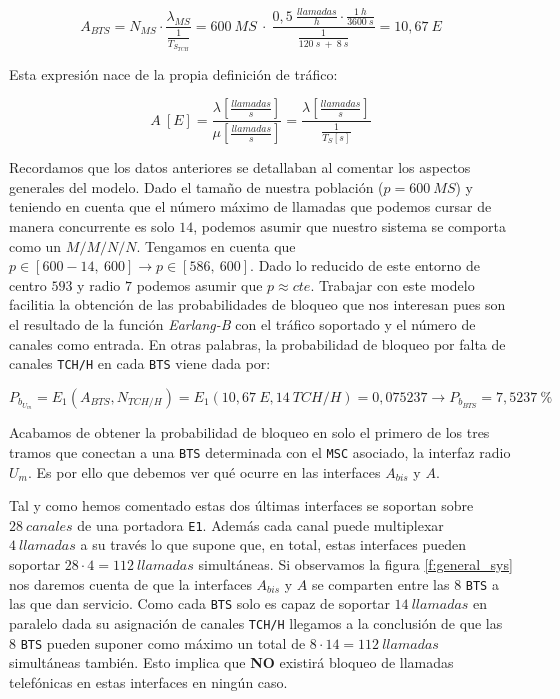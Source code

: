 \documentclass[10pt]{article}
\begin{document}
			$$A_{BTS} = N_{MS} \cdot \frac{\lambda_{MS}}{\frac{1}{T_{S_{TCH}}}} = 600\ MS\ \cdot\ \frac{0,5\ \frac{llamadas}{h} \cdot \frac{1\ h}{3600\ s}}{\frac{1}{120\ s\ +\ 8\ s}} = 10,67\ E$$

			Esta expresión nace de la propia definición de tráfico:
			
			$$A\ [E] = \frac{\lambda [\frac{llamadas}{s}]}{\mu [\frac{llamadas}{s}]} = \frac{\lambda [\frac{llamadas}{s}]}{\frac{1}{T_S [s]}}$$

			Recordamos que los datos anteriores se detallaban al comentar los aspectos generales del modelo. Dado el tamaño de nuestra población ($p = 600\ MS$) y teniendo en cuenta que el número máximo de llamadas que podemos cursar de manera concurrente es solo $14$, podemos asumir que nuestro sistema se comporta como un $M/M/N/N$. Tengamos en cuenta que $p \in [600 - 14,\ 600] \rightarrow p \in [586,\ 600]$. Dado lo reducido de este entorno de centro $593$ y radio $7$ podemos asumir que $p \approx cte$. Trabajar con este modelo facilitia la obtención de las probabilidades de bloqueo que nos interesan pues son el resultado de la función \textit{Earlang-B} con el tráfico soportado y el número de canales como entrada. En otras palabras, la probabilidad de bloqueo por falta de canales \texttt{TCH/H} en cada \texttt{BTS} viene dada por:

			$$P_{b_{U_m}} = E_1(A_{BTS}, N_{TCH/H}) = E_1(10,67\ E, 14\ TCH/H) = 0,075237 \rightarrow P_{b_{BTS}} = 7,5237\ \%$$

			Acabamos de obtener la probabilidad de bloqueo en solo el primero de los tres tramos que conectan a una \texttt{BTS} determinada con el \texttt{MSC} asociado, la interfaz radio $U_m$. Es por ello que debemos ver qué ocurre en las interfaces $A_{bis}$ y $A$.

			Tal y como hemos comentado estas dos últimas interfaces se soportan sobre $28\ canales$ de una portadora \texttt{E1}. Además cada canal puede multiplexar $4\ llamadas$ a su través lo que supone que, en total, estas interfaces pueden soportar $28 \cdot 4 = 112\ llamadas$ simultáneas. Si observamos la figura \ref{f:general_sys} nos daremos cuenta de que la interfaces $A_{bis}$ y $A$ se comparten entre las $8$ \texttt{BTS} a las que dan servicio. Como cada \texttt{BTS} solo es capaz de soportar $14\ llamadas$ en paralelo dada su asignación de canales \texttt{TCH/H} llegamos a la conclusión de que las $8$ \texttt{BTS} pueden suponer como máximo un total de $8 \cdot 14 = 112\ llamadas$ simultáneas también. Esto implica que \textbf{NO} existirá bloqueo de llamadas telefónicas en estas interfaces en ningún caso.
\end{document}
